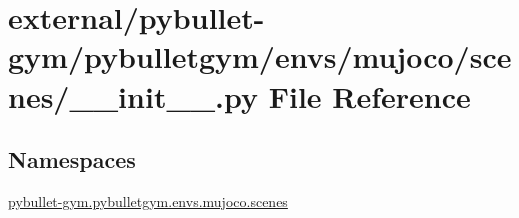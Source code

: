 \hypertarget{external_2pybullet-gym_2pybulletgym_2envs_2mujoco_2scenes_2____init_____8py}{}\section{external/pybullet-\/gym/pybulletgym/envs/mujoco/scenes/\+\_\+\+\_\+init\+\_\+\+\_\+.py File Reference}
\label{external_2pybullet-gym_2pybulletgym_2envs_2mujoco_2scenes_2____init_____8py}
\subsection*{Namespaces}
\begin{DoxyCompactItemize}
\item 
 \hyperlink{namespacepybullet-gym_1_1pybulletgym_1_1envs_1_1mujoco_1_1scenes}{pybullet-\/gym.\+pybulletgym.\+envs.\+mujoco.\+scenes}
\end{DoxyCompactItemize}
